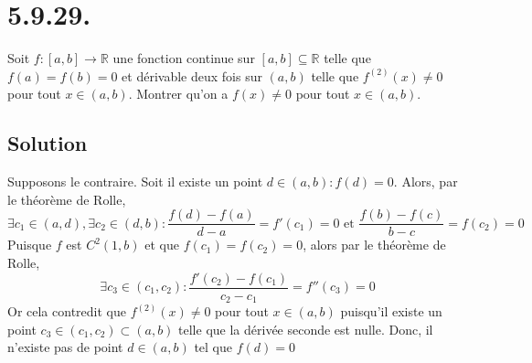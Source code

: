 \section*{5.9.29.}
	Soit $f:[a,b]\longrightarrow\mathbb{R}$ une fonction continue sur $[a,b]\subseteq\mathbb{R}$ telle que $f(a)=f(b)=0$ et dérivable deux fois sur $(a,b)$ telle que $f^{(2)}(x)\neq 0$ pour tout $x\in (a,b)$. Montrer qu'on a $f(x)\neq 0$ pour tout $x\in (a,b)$.
\subsection*{Solution}
Supposons le contraire. Soit il existe un point $d\in (a,b) : f(d)=0$. Alors, par le théorème de Rolle,
\[\exists c_1\in (a,d), \exists c_2\in (d,b) : \frac{f(d)-f(a)}{d-a}=f'(c_1)=0\text{ et }\frac{f(b)-f(c)}{b-c}=f(c_2)=0\]
Puisque $f$ est $C^2(1,b)$ et que $f(c_1)=f(c_2)=0$, alors par le théorème de Rolle,
\[\exists c_3\in (c_1, c_2) : \frac{f'(c_2)-f(c_1)}{c_2-c_1}=f''(c_3)=0\]
Or cela contredit que $f^{(2)}(x)\neq 0$ pour tout $x\in (a,b)$ puisqu'il existe un point $c_3\in (c_1,c_2)\subset (a,b)$ telle que la dérivée seconde est nulle. Donc, il n'existe pas de point $d\in (a,b)$ tel que $f(d)=0$

